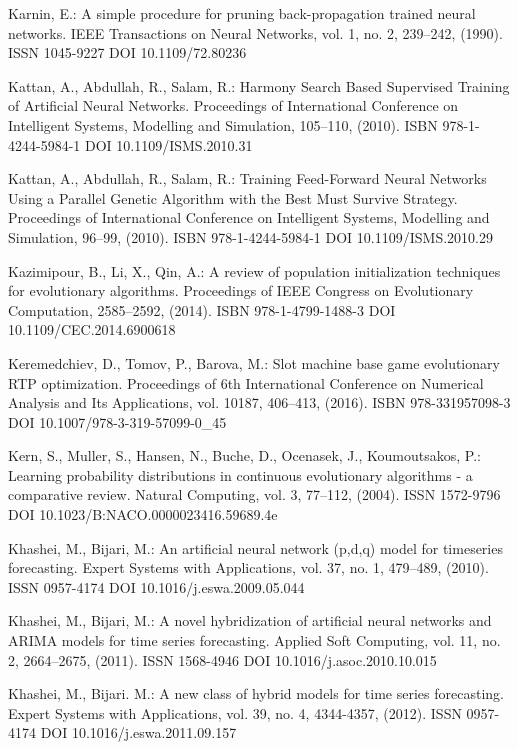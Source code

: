 \begin{thebibliography}{99.}
 Karnin, E.: A simple procedure for pruning back-propagation trained neural networks. IEEE Transactions on Neural Networks, vol. 1, no. 2, 239--242, (1990). ISSN 1045-9227 DOI 10.1109/72.80236

 Kattan, A., Abdullah, R., Salam, R.: Harmony Search Based Supervised Training of Artificial Neural Networks. Proceedings of International Conference on Intelligent Systems, Modelling and Simulation, 105--110, (2010). ISBN 978-1-4244-5984-1 DOI 10.1109/ISMS.2010.31

 Kattan, A., Abdullah, R., Salam, R.: Training Feed-Forward Neural Networks Using a Parallel Genetic Algorithm with the Best Must Survive Strategy. Proceedings of International Conference on Intelligent Systems, Modelling and Simulation, 96--99, (2010). ISBN 978-1-4244-5984-1 DOI 10.1109/ISMS.2010.29

 Kazimipour, B., Li, X., Qin, A.: A review of population initialization techniques for evolutionary algorithms. Proceedings of IEEE Congress on Evolutionary Computation, 2585--2592, (2014). ISBN 978-1-4799-1488-3 DOI 10.1109/CEC.2014.6900618

 Keremedchiev, D., Tomov, P., Barova, M.: Slot machine base game evolutionary RTP optimization. Proceedings of 6th International Conference on Numerical Analysis and Its Applications, vol. 10187, 406--413, (2016). ISBN 978-331957098-3 DOI 10.1007/978-3-319-57099-0\_45

 Kern, S., Muller, S., Hansen, N., Buche, D., Ocenasek, J., Koumoutsakos, P.: Learning probability distributions in continuous evolutionary algorithms - a comparative review. Natural Computing, vol. 3, 77--112, (2004). ISSN 1572-9796 DOI 10.1023/B:NACO.0000023416.59689.4e

 Khashei, M., Bijari, M.: An artificial neural network (p,d,q) model for timeseries forecasting. Expert Systems with Applications, vol. 37, no. 1, 479--489, (2010). ISSN 0957-4174 DOI 10.1016/j.eswa.2009.05.044

 Khashei, M., Bijari, M.: A novel hybridization of artificial neural networks and ARIMA models for time series forecasting. Applied Soft Computing, vol. 11, no. 2, 2664--2675, (2011). ISSN 1568-4946 DOI 10.1016/j.asoc.2010.10.015

 Khashei, M., Bijari. M.: A new class of hybrid models for time series forecasting. Expert Systems with Applications, vol. 39, no. 4, 4344-4357, (2012). ISSN 0957-4174 DOI 10.1016/j.eswa.2011.09.157


\end{thebibliography}
